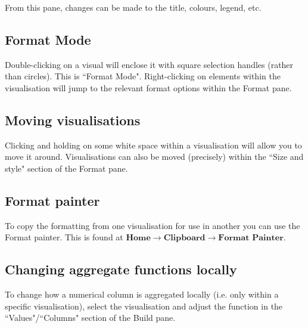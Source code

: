 \documentclass[10pt, openany, twocolumn]{book}
\begin{document}
From this pane, changes can be made to the title, colours, legend, etc.

\subsection*{Format Mode}

Double-clicking on a visual will enclose it with square selection handles (rather than circles). This is ``Format Mode". Right-clicking on elements within the visualisation will jump to the relevant format options within the Format pane.

\subsection*{Moving visualisations}

Clicking and holding on some white space within a visualisation will allow you to move it around. Visualisations can also be moved (precisely) within the ``Size and style" section of the Format pane.

\subsection*{Format painter}

To copy the formatting from one visualisation for use in another you can use the Format painter. This is found at $\textbf{Home} \rightarrow \textbf{Clipboard} \rightarrow \textbf{Format Painter}$.

\subsection*{Changing aggregate functions locally}

To change how a numerical column is aggregated locally (i.e. only within a specific visualisation), select the visualisation and adjust the function in the ``Values"/``Columns" section of the Build pane.
\end{document}
